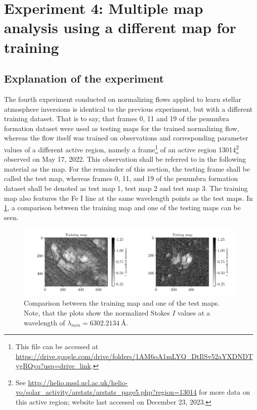 \documentclass[a4paper,11pt]{report}
\def\fc#1{{\color{black}{#1}}} %
\def\lk#1{{\color{black}{#1}}}
\begin{document}
\FloatBarrier
\section{Experiment 4: Multiple map analysis using a different map for training}
\subsection{Explanation of the experiment}
The fourth experiment conducted on normalizing flows applied to learn stellar atmosphere inversions is identical to the previous experiment, but with a different training dataset. That is to say, that frames 0, 11 and 19 of the penumbra formation dataset were used as testing maps for the trained normalizing flow, whereas the flow itself was trained on observations and corresponding parameter values of a different active region, namely a frame\footnote{This file can be accessed at \url{https://drive.google.com/drive/folders/1AM6oA1mLYQ_DtIlSv52aYXDNDTygRQyq?usp=drive_link}.} of an active region \fc{with the NOAA active region number} 13014\footnote{See \url{http://helio.mssl.ucl.ac.uk/helio-vo/solar_activity/arstats/arstats_page5.php?region=13014} for more data on this active region; website last accessed on December 23, 2023.} observed on May 17, 2022. This observation shall be referred to in the following material as the \lk{sunspot} map. For the remainder of this section, the testing frame shall be called the test map, whereas frames 0, 11, and 19 of the penumbra formation dataset shall be denoted as test map 1, test map 2 and test map 3. The training map also features the Fe I line at the same wavelength points as the test maps. In \cref{fig:nf-milne-eddington-example-4-trainingmap-testingmap-nflows-piecewisequadratic}, a comparison between the training map and one of the testing maps can be seen.
\begin{figure}[h!]
\centering
\includegraphics[width=\textwidth]{figures/nf-milne-eddington-example-4-trainingmap-testingmap-nflows-piecewisequadratic.pdf}
\caption{Comparison between the training map and one of the test maps. Note, that the plots show the normalized Stokes $I$ values at a wavelength of $\lambda_{min} = \SI{6302.2134}{\angstrom}$.}
\label{fig:nf-milne-eddington-example-4-trainingmap-testingmap-nflows-piecewisequadratic}
\end{figure}
\end{document}
